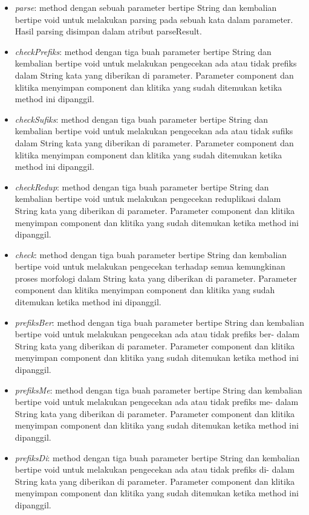 \begin{itemize}
	\item \textit{parse}: method dengan sebuah parameter bertipe String dan kembalian bertipe void untuk melakukan parsing pada sebuah kata dalam parameter. Hasil parsing disimpan dalam atribut parseResult.
	\item \textit{checkPrefiks}: method dengan tiga buah parameter bertipe String dan kembalian bertipe void untuk melakukan pengecekan ada atau tidak prefiks dalam String kata yang diberikan di parameter. Parameter component dan klitika menyimpan component dan klitika yang sudah ditemukan ketika method ini dipanggil.
	\item \textit{checkSufiks}: method dengan tiga buah parameter bertipe String dan kembalian bertipe void untuk melakukan pengecekan ada atau tidak sufiks dalam String kata yang diberikan di parameter. Parameter component dan klitika menyimpan component dan klitika yang sudah ditemukan ketika method ini dipanggil.
	\item \textit{checkRedup}: method dengan tiga buah parameter bertipe String dan kembalian bertipe void untuk melakukan pengecekan reduplikasi dalam String kata yang diberikan di parameter. Parameter component dan klitika menyimpan component dan klitika yang sudah ditemukan ketika method ini dipanggil.
	\item \textit{check}: method dengan tiga buah parameter bertipe String dan kembalian bertipe void untuk melakukan pengecekan terhadap semua kemungkinan proses morfologi dalam String kata yang diberikan di parameter. Parameter component dan klitika menyimpan component dan klitika yang sudah ditemukan ketika method ini dipanggil.
	\item \textit{prefiksBer}: method dengan tiga buah parameter bertipe String dan kembalian bertipe void untuk melakukan pengecekan ada atau tidak prefiks ber- dalam String kata yang diberikan di parameter. Parameter component dan klitika menyimpan component dan klitika yang sudah ditemukan ketika method ini dipanggil.
	\item \textit{prefiksMe}: method dengan tiga buah parameter bertipe String dan kembalian bertipe void untuk melakukan pengecekan ada atau tidak prefiks me- dalam String kata yang diberikan di parameter. Parameter component dan klitika menyimpan component dan klitika yang sudah ditemukan ketika method ini dipanggil.
	\item \textit{prefiksDi}: method dengan tiga buah parameter bertipe String dan kembalian bertipe void untuk melakukan pengecekan ada atau tidak prefiks di- dalam String kata yang diberikan di parameter. Parameter component dan klitika menyimpan component dan klitika yang sudah ditemukan ketika method ini dipanggil.

\end{itemize}
